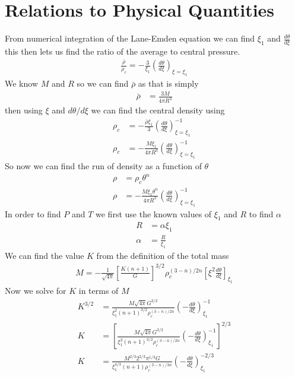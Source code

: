 \section{Relations to Physical Quantities}
From numerical integration of the Lane-Emden equation we can find $\xi_{1}$ and $\frac{d\theta}{d\xi}$ this then lets us find the ratio of the average to central pressure. 
\begin{align*}
    \frac{\bar{\rho}}{\rho_{c}} = -\frac{3}{\xi_{1}}\left(\frac{d\theta}{d\xi}\right)_{\xi=\xi_{1}}
\end{align*}
We know $M$ and $R$ so we can find $\bar{\rho}$ as that is simply
\begin{align*}
    \bar{\rho} &= \frac{3M}{4\pi R^{3}}
\end{align*}
then using $\xi$ and $d\theta/d\xi$ we can find the central density using
\begin{align*}
    \rho_{c} &= -\frac{\bar{\rho}\xi_{1}}{3}\left(\frac{d\theta}{d\xi}\right)_{\xi=\xi_{1}}^{-1} \\
    \rho_{c} &= -\frac{M\xi_{1}}{4\pi R^{3}}\left(\frac{d\theta}{d\xi}\right)_{\xi=\xi_{1}}^{-1}
\end{align*}
So now we can find the run of density as a function of $\theta$
\begin{align*}
    \rho &= \rho_{c}\theta^{n} \\
    \rho &= -\frac{M\xi_{1}\theta^{n}}{4\pi R^{3}}\left(\frac{d\theta}{d\xi}\right)_{\xi=\xi_{1}}^{-1}
\end{align*}
In order to find $P$ and $T$ we first use the known values of $\xi_{1}$ and $R$ to find $\alpha$
\begin{align*}
    R &= \alpha \xi_{1} \\
    \alpha &= \frac{R}{\xi_{1}}
\end{align*}
We can find the value $K$ from the definition of the total mass
\begin{align*}
    M = -\frac{1}{\sqrt{4\pi}}\left[\frac{K(n+1)}{G}\right]^{3/2}\rho_{c}^{(3-n)/2n}\left[\xi^{2}\frac{d\theta}{d\xi}\right]_{\xi_{1}}
\end{align*}
Now we solve for $K$ in terms of $M$
\begin{align*}
    K^{3/2} &= \frac{M\sqrt{4\pi}G^{3/2}}{\xi^{2}_{1}(n+1)^{3/2}\rho_{c}^{(3-n)/2n}}\left(-\frac{d\theta}{d\xi}\right)_{\xi_{1}}^{-1} \\
    K &= \left[\frac{M\sqrt{4\pi}G^{3/2}}{\xi^{2}_{1}(n+1)^{3/2}\rho_{c}^{(3-n)/2n}}\left(-\frac{d\theta}{d\xi}\right)_{\xi_{1}}^{-1}\right]^{2/3} \\
    K &= \frac{M^{2/3}2^{2/3}\pi^{1/3}G}{\xi^{4/3}_{1}(n+1)\rho_{c}^{(3-n)/3n}}\left(-\frac{d\theta}{d\xi}\right)_{\xi_{1}}^{-2/3}
\end{align*}
